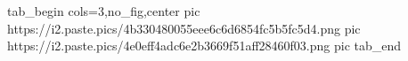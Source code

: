  
 
 
 
 
\zzSecCmtScr

\ifcmt
  tab_begin cols=3,no_fig,center
     pic https://i2.paste.pics/4b330480055eee6c6d6854fc5b5fc5d4.png
     pic https://i2.paste.pics/4e0eff4adc6e2b3669f51aff28460f03.png
     pic 
  tab_end
\fi



